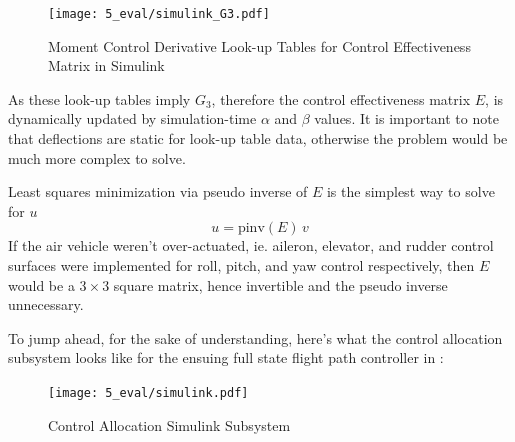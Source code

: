 \documentclass[12pt]{ucthesis}
\begin{document}
	\begin{figure}[H]%
		\begin{adjustwidth}{-1in}{-1in}
			\centering
			\texttt{[image: 5\_eval/simulink\_G3.pdf]}%
		\end{adjustwidth}
		\caption{Moment Control Derivative Look-up Tables for Control Effectiveness Matrix in Simulink}%
		\label{fig: sim_g3_lut}%
	\end{figure}%
As these look-up tables imply $G_3$, therefore the control effectiveness matrix $E$, is dynamically updated by simulation-time $\alpha$ and $\beta$ values. It is important to note that deflections are static for look-up table data, otherwise the problem would be much more complex to solve.

Least squares minimization via pseudo inverse of $E$ is the simplest way to solve for $u$
	\begin{equation}
		u = \text{pinv}(E) \, v 
	\end{equation}
If the air vehicle weren't over-actuated, ie. aileron, elevator, and rudder control surfaces were implemented for roll, pitch, and yaw control respectively, then $E$ would be a $3 \times 3$ square matrix, hence invertible and the pseudo inverse unnecessary.

To jump ahead, for the sake of understanding, here's what the control allocation subsystem looks like for the ensuing full state flight path controller in :
	\begin{figure}[H]
		\begin{adjustwidth}{-1in}{-1in}
			\centering
			\texttt{[image: 5\_eval/simulink.pdf]}%
		\end{adjustwidth}
		\caption{Control Allocation Simulink Subsystem}
		\label{fig: sim_ca}
	\end{figure}
\end{document}
